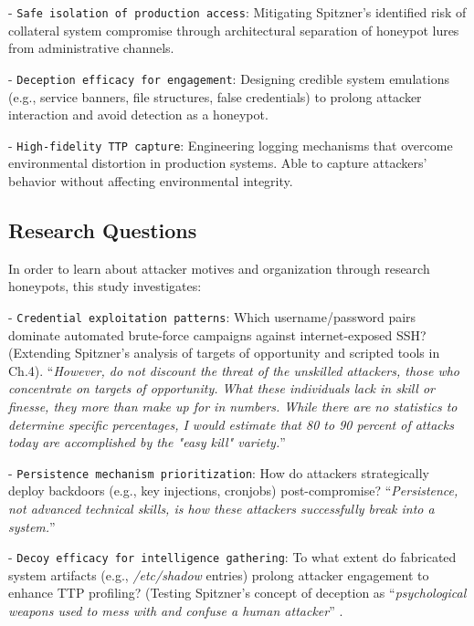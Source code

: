 \documentclass{cls/ULBreport}
\begin{document}
            - \texttt{Safe isolation of production access}: Mitigating Spitzner’s identified risk of collateral system compromise through architectural separation of honeypot lures from administrative channels.

            - \texttt{Deception efficacy for engagement}: Designing credible system emulations (e.g., service banners, file structures, false credentials) to prolong attacker interaction and avoid detection as a honeypot.

            
            - \texttt{High-fidelity TTP capture}: Engineering logging mechanisms that overcome environmental distortion in production systems. Able to capture attackers' behavior without affecting environmental integrity.

        \subsection{Research Questions}
        In order to learn about attacker motives and organization through research honeypots, this study investigates:

            - \texttt{Credential exploitation patterns}: Which username/password pairs dominate automated brute-force campaigns against internet-exposed SSH? (Extending Spitzner’s analysis of targets of opportunity and scripted tools in Ch.4). \enquote{\textit{However, do not discount the threat of the unskilled attackers, those who concentrate on targets of
opportunity. What these individuals lack in skill or finesse, they more than make up for in
numbers. While there are no statistics to determine specific percentages, I would estimate that 80
to 90 percent of attacks today are accomplished by the "easy kill" variety.}} \autocite[Ch.~2, p.~35]{spitzner2002honeypots} 

            - \texttt{Persistence mechanism prioritization}: How do attackers strategically deploy backdoors (e.g., key injections, cronjobs) post-compromise? \enquote{\textit{Persistence, not advanced technical skills, is how these attackers successfully break into a system.}} \autocite[Ch.~2, p.~35]{spitzner2002honeypots} 

            - \texttt{Decoy efficacy for intelligence gathering}: To what extent do fabricated system artifacts (e.g., \textit{/etc/shadow} entries) prolong attacker engagement to enhance TTP profiling? (Testing Spitzner’s concept of deception as \enquote{\textit{psychological weapons used to mess with and confuse a human attacker}} \autocite[Ch.~4, p.~73]{spitzner2002honeypots}.
            
\end{document}
